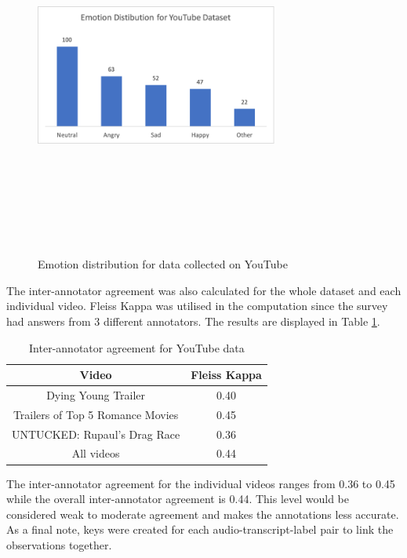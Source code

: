 \documentclass{article}
\newenvironment{subs}
  {\adjustwidth{3em}{0pt}}
  {\endadjustwidth}
\begin{document}
\begin{subs}
    \begin{figure}[H]
        \centering
        \includegraphics[width=8cm,height=12cm,keepaspectratio]{Images/emo_yt.png}
        \caption{Emotion distribution for data collected on YouTube}
        \label{fig:emo_YouTube}
    \end{figure}
    
The inter-annotator agreement was also calculated for the whole dataset and each individual video. Fleiss Kappa was utilised in the computation since the survey had answers from 3 different annotators. The results are displayed in Table \ref{Table_fleiss}.

    \begin{table}[H]
        \centering
        \begin{tabular}{|   c   c|}
        \hline
        Video & Fleiss Kappa \\
        \hline
        Dying Young Trailer & 0.40 \\
        Trailers of Top 5 Romance Movies & 0.45 \\
        UNTUCKED: Rupaul's Drag Race & 0.36 \\
        All videos & 0.44 \\
        \hline
        \end{tabular}
        \caption{Inter-annotator agreement for YouTube data}
        \label{Table_fleiss}
    \end{table}

The inter-annotator agreement for the individual videos ranges from 0.36 to 0.45 while the overall inter-annotator agreement is 0.44. This level would be considered weak to moderate agreement and makes the annotations less accurate. As a final note, keys were created for each audio-transcript-label pair to link the observations together.
\end{subs}
\end{document}
